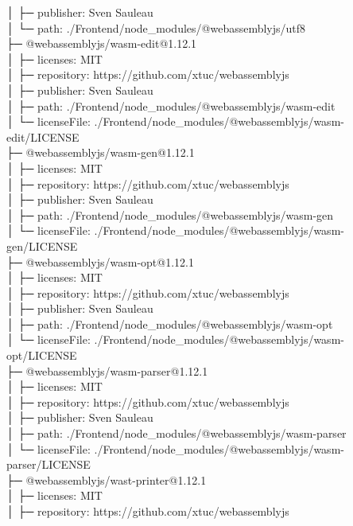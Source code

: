 \documentclass[
    paper=a4,
    twoside=false,
    parskip=half,
    listof=entryprefix,
    listof=totoc,
    index=totoc,
    bibliography=totoc,
    headsepline,
]{scrbook}
\begin{document}
    │  ├─ publisher: Sven Sauleau\\
    │  └─ path: ./Frontend/node\_modules/@webassemblyjs/utf8\\
    ├─ @webassemblyjs/wasm-edit@1.12.1\\
    │  ├─ licenses: MIT\\
    │  ├─ repository: https://github.com/xtuc/webassemblyjs\\
    │  ├─ publisher: Sven Sauleau\\
    │  ├─ path: ./Frontend/node\_modules/@webassemblyjs/wasm-edit\\
    │  └─ licenseFile: ./Frontend/node\_modules/@webassemblyjs/wasm-edit/LICENSE\\
    ├─ @webassemblyjs/wasm-gen@1.12.1\\
    │  ├─ licenses: MIT\\
    │  ├─ repository: https://github.com/xtuc/webassemblyjs\\
    │  ├─ publisher: Sven Sauleau\\
    │  ├─ path: ./Frontend/node\_modules/@webassemblyjs/wasm-gen\\
    │  └─ licenseFile: ./Frontend/node\_modules/@webassemblyjs/wasm-gen/LICENSE\\
    ├─ @webassemblyjs/wasm-opt@1.12.1\\
    │  ├─ licenses: MIT\\
    │  ├─ repository: https://github.com/xtuc/webassemblyjs\\
    │  ├─ publisher: Sven Sauleau\\
    │  ├─ path: ./Frontend/node\_modules/@webassemblyjs/wasm-opt\\
    │  └─ licenseFile: ./Frontend/node\_modules/@webassemblyjs/wasm-opt/LICENSE\\
    ├─ @webassemblyjs/wasm-parser@1.12.1\\
    │  ├─ licenses: MIT\\
    │  ├─ repository: https://github.com/xtuc/webassemblyjs\\
    │  ├─ publisher: Sven Sauleau\\
    │  ├─ path: ./Frontend/node\_modules/@webassemblyjs/wasm-parser\\
    │  └─ licenseFile: ./Frontend/node\_modules/@webassemblyjs/wasm-parser/LICENSE\\
    ├─ @webassemblyjs/wast-printer@1.12.1\\
    │  ├─ licenses: MIT\\
    │  ├─ repository: https://github.com/xtuc/webassemblyjs\\
\end{document}
